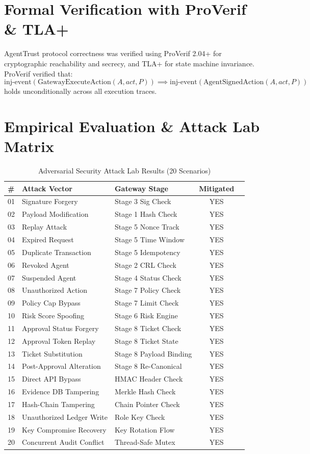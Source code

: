 \documentclass[10pt,journal,compsoc]{IEEEtran}
\begin{document}
\section{Formal Verification with ProVerif \& TLA+}
AgentTrust protocol correctness was verified using ProVerif 2.04+ for cryptographic reachability and secrecy, and TLA+ for state machine invariance.
ProVerif verified that:
\[
\text{inj-event}(\text{GatewayExecuteAction}(A, act, P)) \implies \text{inj-event}(\text{AgentSignedAction}(A, act, P))
\]
holds unconditionally across all execution traces.

\section{Empirical Evaluation \& Attack Lab Matrix}

\begin{table}[h]
\caption{Adversarial Security Attack Lab Results (20 Scenarios)}
\centering
\begin{tabular}{@{}lllcc@{}}
\toprule
\textbf{\#} & \textbf{Attack Vector} & \textbf{Gateway Stage} & \textbf{Mitigated} \\ \midrule
01 & Signature Forgery & Stage 3 Sig Check & YES \\
02 & Payload Modification & Stage 1 Hash Check & YES \\
03 & Replay Attack & Stage 5 Nonce Track & YES \\
04 & Expired Request & Stage 5 Time Window & YES \\
05 & Duplicate Transaction & Stage 5 Idempotency & YES \\
06 & Revoked Agent & Stage 2 CRL Check & YES \\
07 & Suspended Agent & Stage 4 Status Check & YES \\
08 & Unauthorized Action & Stage 7 Policy Check & YES \\
09 & Policy Cap Bypass & Stage 7 Limit Check & YES \\
10 & Risk Score Spoofing & Stage 6 Risk Engine & YES \\
11 & Approval Status Forgery & Stage 8 Ticket Check & YES \\
12 & Approval Token Replay & Stage 8 Ticket State & YES \\
13 & Ticket Substitution & Stage 8 Payload Binding & YES \\
14 & Post-Approval Alteration & Stage 8 Re-Canonical & YES \\
15 & Direct API Bypass & HMAC Header Check & YES \\
16 & Evidence DB Tampering & Merkle Hash Check & YES \\
17 & Hash-Chain Tampering & Chain Pointer Check & YES \\
18 & Unauthorized Ledger Write & Role Key Check & YES \\
19 & Key Compromise Recovery & Key Rotation Flow & YES \\
20 & Concurrent Audit Conflict & Thread-Safe Mutex & YES \\
\bottomrule
\end{tabular}
\end{table}
\end{document}
